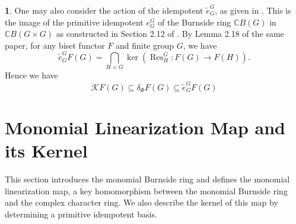 \documentclass[12pt]{article}
\theoremstyle{plain}
\theoremstyle{definition}
\newtheorem{nothing}[theorem]{}
\newcommand{\res}{\operatorname{Res}}
\begin{document}
\begin{nothing}
    One may also consider the action of the idempotent $\tilde e_G^G$, as given in \cite{Bouc}. This is the image of the primitive idempotent $e_G^G$ of the Burnside ring $\mathbb CB(G)$ in $\mathbb CB(G\times G)$ as constructed in Section 2.12 of \cite{Bouc2}. By Lemma 2.18 of the same paper, for any biset functor $F$ and finite group $G$, we have
    \[
    \tilde e_G^GF(G) = \bigcap_{H<G} \ker(\res^G_H:F(G) \to F(H)).
    \] Hence we have
    \[
\mathcal{K}F(G)\subseteq \delta_\Phi F(G) \subseteq \tilde e_G^GF(G)
\]
\end{nothing}
\section{Monomial Linearization Map and its Kernel}\label{sec:mon}

This section introduces the monomial Burnside ring and defines the monomial linearization map, a key homomorphism between the monomial Burnside ring and the complex character ring. We also describe the kernel of this map by determining a primitive idempotent basis.
\end{document}
